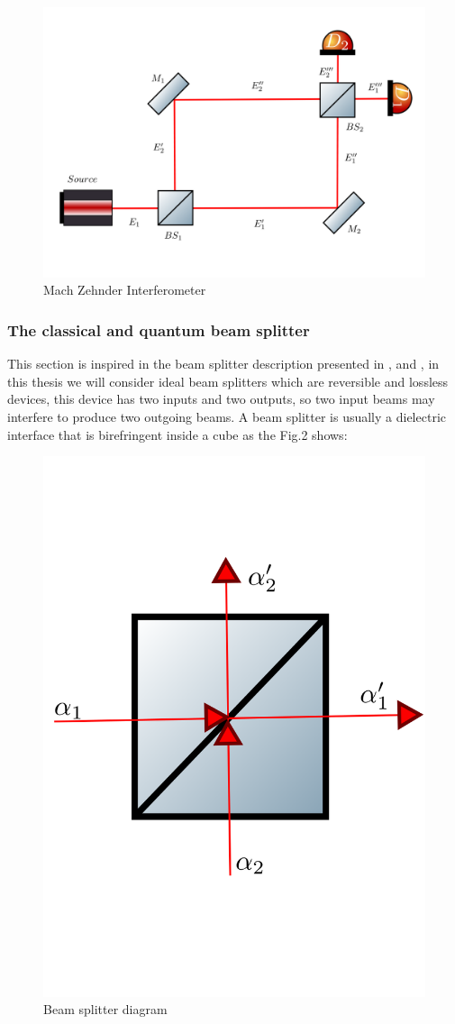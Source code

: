 \documentclass[12pt]{book}
\begin{document}
\begin{figure}[h]
\centering
\includegraphics[width=\linewidth]{images/machzenhdercla.png}
\caption{Mach Zehnder Interferometer}
\label{fig:BS2}
\end{figure}

\subsubsection{The classical and quantum beam splitter}

This section is inspired in the beam splitter description presented in \cite{Loudon},\cite{gerry} and \cite{leonhartd}, in this thesis we will consider ideal beam splitters which are reversible and lossless devices, this device has two inputs and two outputs, so two input beams may interfere to produce two outgoing beams. A beam splitter is usually a dielectric interface that is birefringent inside a cube as the Fig.2 shows: 

\begin{figure}[h]
\centering
\includegraphics[width=5 cm,height=5 cm]{images/bS.png}
\caption{Beam splitter diagram}
\label{fig:BS2}
\end{figure}
\end{document}
